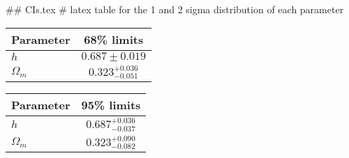 ## CIs.tex
# latex table for the 1 and 2 sigma distribution of each parameter

\begin{tabular} { l  c}
 Parameter &  68\% limits\\
\hline
{\boldmath$h              $} & $0.687\pm 0.019            $\\
{\boldmath$\Omega_m       $} & $0.323^{+0.036}_{-0.051}   $\\
\hline
\end{tabular}

\begin{tabular} { l  c}
 Parameter &  95\% limits\\
\hline
{\boldmath$h              $} & $0.687^{+0.036}_{-0.037}   $\\
{\boldmath$\Omega_m       $} & $0.323^{+0.090}_{-0.082}   $\\
\hline
\end{tabular}
